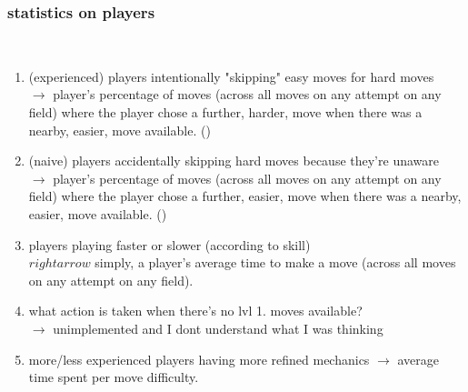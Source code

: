     \subsubsection{\textbf{statistics on players}} \hfill \\
        \begin{enumerate}
            \item (experienced) players intentionally "skipping" easy moves for hard moves \\
            $\rightarrow$ player's percentage of moves (across all moves on any attempt on any field) where the player chose a further, harder, move when there was a nearby, easier, move available. ()
        
            \item (naive) players accidentally skipping hard moves because they're unaware \\
            $\rightarrow$ player's percentage of moves (across all moves on any attempt on any field) where the player chose a further, easier, move when there was a nearby, easier, move available. ()
            
            \item players playing faster or slower (according to skill) \\
            $rightarrow$ simply, a player's average time to make a move (across all moves on any attempt on any field).
            
        
            \item what action is taken when there's no lvl 1. moves available? \\
            $\rightarrow$ unimplemented and I dont understand what I was thinking
        
            \item more/less experienced players having more refined mechanics
            $\rightarrow$ average time spent per move difficulty. \\
        \end{enumerate}
    
